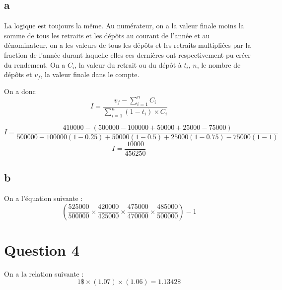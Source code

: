 \documentclass[11pt,french]{article}
\begin{document}
\subsection{a}
La logique est toujours la même. Au numérateur, on a la valeur finale moins la somme de tous les retraits et les dépôts au courant de l'année et au dénominateur, on a les valeurs de tous les dépôts et les retraits multipliées par la fraction de l'année durant laquelle elles ces dernières ont respectivement pu créer du rendement. On a $C_i$, la valeur du retrait ou du dépôt à $t_i$, $n$, le nombre de dépôts et $v_f$, la valeur finale dans le compte. 

On a donc 
$$
I = \frac{v_f - \sum_{i=1}^n C_i}{\sum_{i=1}^n (1 - t_i) \times C_i}
$$

$$
I = \frac{410000 - (500000 - 100000 + 50000 + 25000 - 75000)}
{500000 - 100000 (1 - 0.25) + 50000 (1 - 0.5) + 25000 ( 1 - 0.75) - 75000 (1-1)}
$$
$$
I = \frac{10000}{456250}
$$

\subsection{b}
On a l'équation suivante :
$$
\left(\frac{525000}{500000}\times \frac{420000}{425000}
\times \frac{475000}{470000}\times\frac{485000}{500000} \right) - 1
$$

\section{Question 4}
On a la relation suivante :
$$
1 \$ \times (1.07) \times (1.06) = 1.1342 \$
$$
\end{document}
